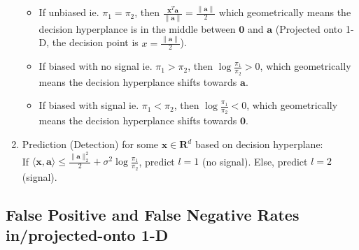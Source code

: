 \documentclass[11pt]{article}
\begin{document}
\begin{enumerate}
    \begin{itemize}
        \item If unbiased ie. $\pi_1=\pi_2$, then $\frac{\mathbf{x}^T\mathbf{a}}{\lVert \mathbf{a} \rVert} = \frac{\lVert \mathbf{a} \rVert}{2}$ which geometrically means the decision hyperplance is in the middle between $\mathbf{0}$ and $\mathbf{a}$ (Projected onto 1-D, the decision point is $x=\frac{\lVert \mathbf{a} \rVert}{2}$).
        \item If biased with no signal ie. $\pi_1>\pi_2$, then $\log{\frac{\pi_1}{\pi_2}}>0$, which geometrically means the decision hyperplance shifts towards $\mathbf{a}$.
        \item If biased with signal ie. $\pi_1<\pi_2$, then $\log{\frac{\pi_1}{\pi_2}}<0$, which geometrically means the decision hyperplance shifts towards $\mathbf{0}$.
    \end{itemize}
    
    \item Prediction (Detection) for some $\mathbf{x} \in \mathbf{R}^d$ based on decision hyperplane:\\
    If $\langle \mathbf{x}, \mathbf{a} \rangle \leq \frac{\lVert \mathbf{a} \rVert_2^2}{2} + \sigma^2\log{\frac{\pi_1}{\pi_2}}$, predict $l=1$ (no signal). Else, predict $l=2$ (signal).
    
\end{enumerate}

\subsection{False Positive and False Negative Rates in/projected-onto 1-D}
    
\end{document}
